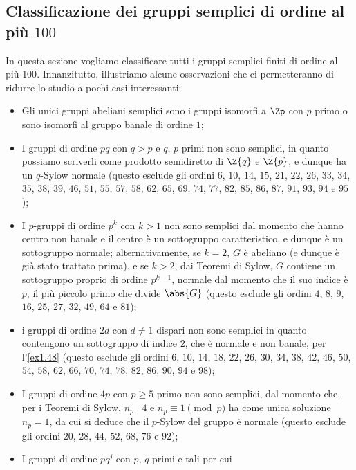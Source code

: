 \documentclass[11pt]{scrartcl}
\begin{document}
	\newpage
	
	\subsection{Classificazione dei gruppi semplici di ordine al più $100$}
	
	In questa sezione vogliamo classificare tutti i gruppi semplici finiti di 
	ordine al più $100$. Innanzitutto, illustriamo alcune osservazioni che
	ci permetteranno di ridurre lo studio a pochi casi interessanti:
	
	\begin{itemize}
		\item Gli unici gruppi abeliani semplici sono i gruppi isomorfi a $\Zp$ con $p$ primo o sono isomorfi al gruppo banale di ordine $1$;
		\item I gruppi di ordine $pq$ con $q > p$ e $q$, $p$ primi non sono semplici, in
quanto possiamo scriverli come prodotto semidiretto di $\Z{q}$ e $\Z{p}$, e dunque ha un $q$-Sylow normale (questo esclude gli ordini $6$, $10$, $14$, $15$, $21$, $22$, $26$, $33$, $34$, $35$, $38$, $39$, $46$, $51$, $55$, $57$, $58$, $62$, $65$, $69$, $74$, $77$, $82$, $85$, $86$, $87$, $91$, $93$, $94$ e $95$);
		\item I $p$-gruppi di ordine $p^k$ con $k > 1$ non sono semplici dal momento
		che hanno centro non banale e il centro è un sottogruppo caratteristico,
		e dunque è un sottogruppo normale; alternativamente, se $k = 2$, $G$ è abeliano (e dunque è già stato trattato prima), e se $k > 2$, dai Teoremi di Sylow,
		$G$ contiene un sottogruppo proprio di ordine $p^{k - 1}$, normale dal momento che
		il suo indice è $p$, il più piccolo primo che divide $\abs{G}$ (questo esclude gli ordini $4$, $8$, $9$, $16$, $25$, $27$, $32$, $49$, $64$ e $81$);
		\item i gruppi di ordine $2d$ con $d \neq 1$ dispari non sono semplici in quanto
		contengono un sottogruppo di indice $2$, che è normale e non banale, per 
		l'\autoref{ex1.48} (questo esclude gli ordini $6$, $10$, $14$, $18$, $22$, $26$, $30$, $34$, $38$, $42$, $46$, $50$, $54$, $58$, $62$, $66$, $70$, $74$, $78$, $82$, $86$, $90$, $94$ e $98$);
		\item I gruppi di ordine $4p$ con $p \geq 5$ primo non sono semplici, dal
		momento che, per i Teoremi di Sylow, $n_p \mid 4$ e $n_p \equiv 1 \pmod{p}$ ha
		come unica soluzione $n_p = 1$, da cui si deduce che il $p$-Sylow del gruppo
		è normale (questo esclude gli ordini $20$, $28$, $44$, $52$, $68$, $76$ e $92$);
		\item I gruppi di ordine $p q^j$ con $p$, $q$ primi e tali per cui

\end{itemize}
\end{document}
